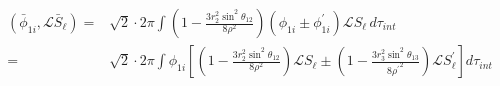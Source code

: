 \documentclass[Dissertation.tex]{subfiles}
\begin{document}


\begin{align}
\label{eq:DWavePhi1SBar}
\nonumber \left(\bar{\phi}_{1i},\mathcal{L} \bar{S}_\ell\right) = & \sqrt{2} \cdot 2\pi \int \left(1 - \frac{3 r_2^2 \sin^2\theta_{12}}{8 \rho^2} \right) \left(\phi_{1i} \pm \phi_{1i}^\prime \right) \mathscr{L}S_\ell \, d\tau_{int} \\
=& \sqrt{2} \cdot 2\pi \int \phi_{1i} \left[ \left(1 - \frac{3 r_2^2 \sin^2\theta_{12}}{8 \rho^2} \right) \mathscr{L}S_\ell \pm \left(1 - \frac{3 r_3^2 \sin^2\theta_{13}}{8 {\rho^\prime}^2} \right) \mathscr{L}S_\ell^\prime \right] d\tau_{int}
\end{align}
\end{document}
